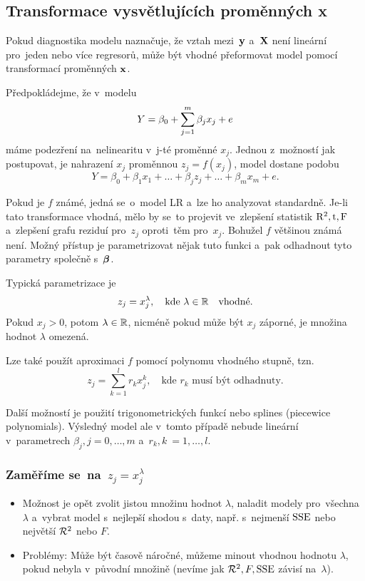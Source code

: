 \subsection{Transformace vysvětlujících proměnných x}

Pokud diagnostika modelu naznačuje, že vztah mezi~$\mathbf{y}$ a~$\mathbf{X}$ není lineární pro~jeden nebo více regresorů, může být vhodné přeformovat model pomocí transformací proměnných $\mathbf{x}$.

Předpokládejme, že v~modelu $$Y = \beta_0 + \sum_{j=1}^{m} \beta_j x_j + e$$ máme podezření na~nelinearitu v~j-té proměnné $x_j$. Jednou z~možností jak postupovat, je nahrazení $x_j$ proměnnou $z_j = f(x_j)$, model dostane podobu $$Y = \beta_0 + \beta_1 x_1 +\dots + \beta_j z_j +\dots + \beta_m x_m + e.$$

Pokud je $f$ známé, jedná se~o~model LR a~lze ho analyzovat standardně. Je-li tato transformace vhodná, mělo by se~to projevit ve~zlepšení statistik $\mathrm{R}^2, \mathrm{t}, \text{F}$ a~zlepšení grafu reziduí pro~$z_j$ oproti~těm pro~$x_j$. Bohužel $f$ většinou známá není. Možný přístup je parametrizovat nějak tuto funkci a~pak odhadnout tyto parametry společně s~$\boldsymbol{\beta}$.

Typická parametrizace je
 $$
  z_j = x_j^{\lambda}, \quad \text{kde } \lambda \in \mathbb{R} \quad \text{vhodné}.
 $$
Pokud $x_j > 0$, potom $\lambda \in \mathbb{R}$, nicméně pokud může být $x_j$ záporné, je množina hodnot $\lambda$ omezená.

Lze také použít aproximaci $f$ pomocí polynomu vhodného stupně, tzn.
 $$
  z_j = \sum_{k = 1}^l r_k x_j^k, \quad \text{kde } r_k \text{ musí být odhadnuty.}
 $$
 
Další možností je použití trigonometrických funkcí nebo splines (piecewice polynomials). Výsledný model ale v~tomto případě nebude lineární v~parametrech $\beta_j, j = 0,\dots,m$ \linebreak a~$ r_k, k~ = 1,\dots,l $.

\subsubsection{Zaměříme se~na~$z_j = x_j^\lambda$}
\begin{itemize}
	\item Možnost je opět zvolit jistou množinu hodnot $\lambda$, naladit modely pro~všechna $\lambda$ a~vybrat model s~nejlepší shodou s~daty, např. s~nejmenší $\mathrm{SSE}$ nebo největší $\mathcal{R}^2$ nebo $F$.
	\item Problémy: Může být časově náročné, můžeme minout vhodnou hodnotu $\lambda$, pokud nebyla v~původní množině (nevíme jak $\mathcal{R}^2,F,\mathrm{SSE}$ závisí na~$\lambda$).
\end{itemize}

